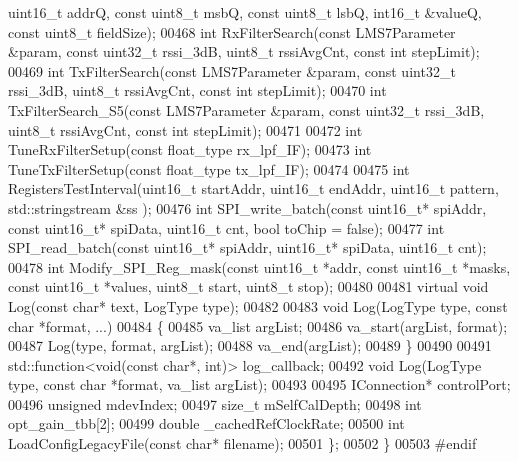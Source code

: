 \begin{DoxyCode}
      uint16\_t addrQ, \textcolor{keyword}{const} uint8\_t msbQ, \textcolor{keyword}{const} uint8\_t lsbQ, int16\_t &valueQ, \textcolor{keyword}{const} uint8\_t fieldSize);
00468     \textcolor{keywordtype}{int} RxFilterSearch(\textcolor{keyword}{const} LMS7Parameter &param, \textcolor{keyword}{const} uint32\_t rssi\_3dB, uint8\_t rssiAvgCnt, \textcolor{keyword}{const} \textcolor{keywordtype}{int} 
      stepLimit);
00469     \textcolor{keywordtype}{int} TxFilterSearch(\textcolor{keyword}{const} LMS7Parameter &param, \textcolor{keyword}{const} uint32\_t rssi\_3dB, uint8\_t rssiAvgCnt, \textcolor{keyword}{const} \textcolor{keywordtype}{int} 
      stepLimit);
00470     \textcolor{keywordtype}{int} TxFilterSearch\_S5(\textcolor{keyword}{const} LMS7Parameter &param, \textcolor{keyword}{const} uint32\_t rssi\_3dB, uint8\_t rssiAvgCnt, \textcolor{keyword}{const} \textcolor{keywordtype}{
      int} stepLimit);
00471 
00472     \textcolor{keywordtype}{int} TuneRxFilterSetup(\textcolor{keyword}{const} float\_type rx\_lpf\_IF);
00473     \textcolor{keywordtype}{int} TuneTxFilterSetup(\textcolor{keyword}{const} float\_type tx\_lpf\_IF);
00474 
00475     \textcolor{keywordtype}{int} RegistersTestInterval(uint16\_t startAddr, uint16\_t endAddr, uint16\_t pattern, std::stringstream &ss
      );
00476     \textcolor{keywordtype}{int} SPI_write_batch(\textcolor{keyword}{const} uint16\_t* spiAddr, \textcolor{keyword}{const} uint16\_t* spiData, uint16\_t cnt, \textcolor{keywordtype}{bool} 
      toChip = \textcolor{keyword}{false});
00477     \textcolor{keywordtype}{int} SPI_read_batch(\textcolor{keyword}{const} uint16\_t* spiAddr, uint16\_t* spiData, uint16\_t cnt);
00478     \textcolor{keywordtype}{int} Modify_SPI_Reg_mask(\textcolor{keyword}{const} uint16\_t *addr, \textcolor{keyword}{const} uint16\_t *masks, \textcolor{keyword}{const} uint16\_t *values, uint8\_t 
      start, uint8\_t stop);
00480 
00481     \textcolor{keyword}{virtual} \textcolor{keywordtype}{void} Log(\textcolor{keyword}{const} \textcolor{keywordtype}{char}* text, LogType type);
00482 
00483     \textcolor{keywordtype}{void} Log(LogType type, \textcolor{keyword}{const} \textcolor{keywordtype}{char} *format, ...)
00484     \{
00485         va\_list argList;
00486         va\_start(argList, format);
00487         Log(type, format, argList);
00488         va\_end(argList);
00489     \}
00490 
00491     std::function<void(const char*, int)> log_callback;
00492     \textcolor{keywordtype}{void} Log(LogType type, \textcolor{keyword}{const} \textcolor{keywordtype}{char} *format, va\_list argList);
00493 
00495     IConnection* controlPort;
00496     \textcolor{keywordtype}{unsigned} mdevIndex;
00497     \textcolor{keywordtype}{size\_t} mSelfCalDepth;
00498     \textcolor{keywordtype}{int} opt\_gain\_tbb[2];
00499     \textcolor{keywordtype}{double} _cachedRefClockRate;
00500     \textcolor{keywordtype}{int} LoadConfigLegacyFile(\textcolor{keyword}{const} \textcolor{keywordtype}{char}* filename);
00501 \};
00502 \}
00503 \textcolor{preprocessor}{#endif}
\end{DoxyCode}
